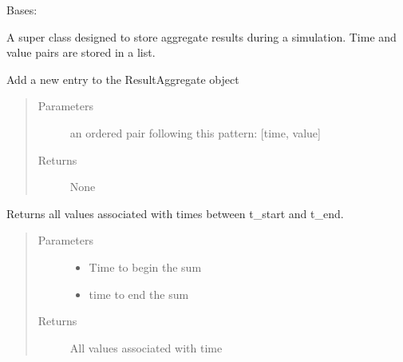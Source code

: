 \documentclass[letterpaper,10pt,english]{sphinxmanual}
\begin{document}
\begin{fulllineitems}
\label{\detokenize{index:feast.EmissionSimModules.result_classes.ResultAggregate}}
Bases: 

A super class designed to store aggregate results during a simulation.
Time and value pairs are stored in a list.

\begin{fulllineitems}
\label{\detokenize{index:feast.EmissionSimModules.result_classes.ResultAggregate.append_entry}}
Add a new entry to the ResultAggregate object
\begin{quote}\begin{description}
\item[{Parameters}] \leavevmode
{} \textendash{} an ordered pair following this pattern: {[}time, value{]}

\item[{Returns}] \leavevmode
None

\end{description}\end{quote}

\end{fulllineitems}


\begin{fulllineitems}
\label{\detokenize{index:feast.EmissionSimModules.result_classes.ResultAggregate.get_vals}}
Returns all values associated with times between t\_start and t\_end.
\begin{quote}\begin{description}
\item[{Parameters}] \leavevmode\begin{itemize}
\item {} 
 \textendash{} Time to begin the sum

\item {} 
 \textendash{} time to end the sum

\end{itemize}

\item[{Returns}] \leavevmode
All values associated with time

\end{description}\end{quote}

\end{fulllineitems}


\end{fulllineitems}
\end{document}
